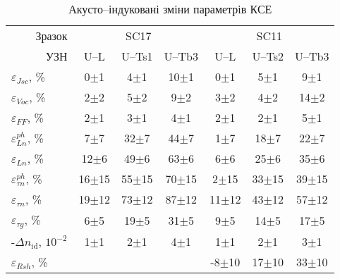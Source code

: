 \begin{table}
\caption{\label{tabAIEfect}Акусто--індуковані зміни параметрів КСЕ
}
\center
\begin{tabular}{|l|c|c|c|c|c|c|}
\hline
\multicolumn{1}{|r|}{Зразок}&\multicolumn{3}{c|}{SC17}&\multicolumn{3}{c|}{SC11}\\
\cline{1-7}
\multicolumn{1}{|r|}{УЗН}&U--L&U--Ts1&U--Tb3&U--L&U--Ts2&U--Tb3\\
\hhline{|=======|}
$\varepsilon_{Jsc}$, \%&0$\pm$1&4$\pm$1&10$\pm$1&0$\pm$1&5$\pm$1&9$\pm$1\\ \hline
$\varepsilon_{Voc}$, \%&2$\pm$2&5$\pm$2&9$\pm$2&3$\pm$2&4$\pm$2&14$\pm$2\\ \hline
$\varepsilon_{F\!F}$, \%&2$\pm$1&3$\pm$1&4$\pm$1&2$\pm$1&2$\pm$1&5$\pm$1\\ \hline
$\varepsilon_{Ln}^{ph}$, \%&7$\pm$7&32$\pm$7&44$\pm$7&1$\pm$7&18$\pm$7&22$\pm$7\\ \hline
$\varepsilon_{Ln}$, \%&12$\pm$6&49$\pm$6&63$\pm$6&6$\pm$6&25$\pm$6&35$\pm$6\\ \hline
$\varepsilon_{\tau n}^{ph}$, \%&16$\pm$15&55$\pm$15&70$\pm$15&2$\pm$15&33$\pm$15&39$\pm$15\\ \hline
$\varepsilon_{\tau n}$, \%&19$\pm$12&73$\pm$12&87$\pm$12&11$\pm$12&43$\pm$12&57$\pm$12\\ \hline
$\varepsilon_{\tau g}$, \%&6$\pm$5&19$\pm$5&31$\pm$5&9$\pm$5&14$\pm$5&17$\pm$5\\ \hline
-$\Delta n_\mathrm{id}$, $10^{-2}$&1$\pm$1&2$\pm$1&4$\pm$1&1$\pm$1&2$\pm$1&3$\pm$1\\ \hline
$\varepsilon_{R sh}$, \%&&&&-8$\pm$10&17$\pm$10&33$\pm$10\\ \hline
\end{tabular}
\end{table}

